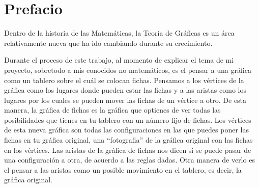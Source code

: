 \chapter{Prefacio}
\label{sec:prefacio}

Dentro de la historia de las Matem\'aticas, la Teor\'ia de Gr\'aficas es un
\'area relativamente nueva que ha ido cambiando durante su crecimiento. 

Durante el proceso de este trabajo, al momento de explicar el tema de mi
proyecto, sobretodo a mis conocidos no matem\'aticos, es el pensar a una
gr\'afica como un tablero sobre el cu\'al se colocan fichas. Pensamos a los
v\'ertices de la gr\'afica como los lugares donde pueden estar las fichas y a
las aristas como los lugares por los cuales se pueden mover las fichas de un
v\'ertice a otro. De esta manera, la gr\'afica de fichas es la gr\'afica que
optienes de ver todas las posibilidades que tienes en tu tablero con un n\'umero
fijo de fichas. Los v\'ertices de esta nueva gr\'afica son todas las
configuraciones en las que puedes poner las fichas en tu gr\'afica original, una
``fotografia'' de la gr\'afica original con las fichas en los v\'ertices. Las
aristas de la gr\'afica de fichas nos dicen si se puede pasar de una
configuraci\'on a otra, de acuerdo a las reglas dadas. Otra manera de verlo es
el pensar a las aristas como un posible movimiento en el tablero, es decir, la gr\'afica original.

